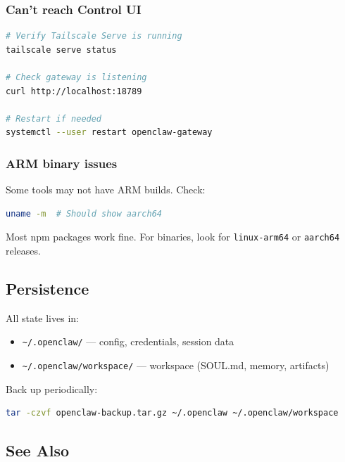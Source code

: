 \subsubsection{Can't reach Control UI}


\begin{lstlisting}[language=bash]
# Verify Tailscale Serve is running
tailscale serve status

# Check gateway is listening
curl http://localhost:18789

# Restart if needed
systemctl --user restart openclaw-gateway
\end{lstlisting}


\subsubsection{ARM binary issues}


Some tools may not have ARM builds. Check:

\begin{lstlisting}[language=bash]
uname -m  # Should show aarch64
\end{lstlisting}


Most npm packages work fine. For binaries, look for \texttt{linux-arm64} or \texttt{aarch64} releases.

\hrulefill


\subsection{Persistence}


All state lives in:

\begin{itemize}
  \item \texttt{\textasciitilde{}/.openclaw/} — config, credentials, session data
  \item \texttt{\textasciitilde{}/.openclaw/workspace/} — workspace (SOUL.md, memory, artifacts)
\end{itemize}


Back up periodically:

\begin{lstlisting}[language=bash]
tar -czvf openclaw-backup.tar.gz ~/.openclaw ~/.openclaw/workspace
\end{lstlisting}


\hrulefill


\subsection{See Also}


